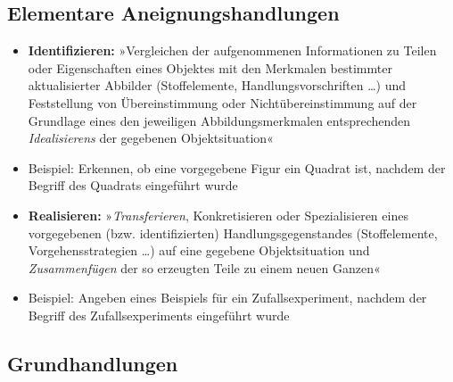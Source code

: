\documentclass[
]{scrbook}
\renewenvironment{quote}{
  \list{}{
	\leftmargin0.2cm   %
    \rightmargin\leftmargin
      	\def\FrameCommand
    {%
        {\color{quoteColor}\vrule width 2pt}%
        \hspace{0pt}%
    }%
    \MakeFramed{\advance \hsize -\width \FrameRestore}    \color{quoteColor}
    }
  \item\relax
}
{\endlist\color{black}\endMakeFramed}
\theoremstyle{definition}
\theoremstyle{definition}
\theoremstyle{definition}
\theoremstyle{definition}
\theoremstyle{remark}
\begin{document}
\subsection{Elementare Aneignungshandlungen}\label{elementare-aneignungshandlungen}

\begin{itemize}
\item
  \textbf{Identifizieren:} »Vergleichen der aufgenommenen Informationen zu Teilen oder Eigenschaften eines Objektes mit den Merkmalen bestimmter aktualisierter Abbilder (Stoffelemente, Handlungsvorschriften \ldots) und Feststellung von Übereinstimmung oder Nichtübereinstimmung auf der Grundlage eines den jeweiligen Abbildungsmerkmalen entsprechenden \emph{Idealisierens} der gegebenen Objektsituation«

  \begin{quote}
  Beispiel: Erkennen, ob eine vorgegebene Figur ein Quadrat ist, nachdem der Begriff des Quadrats eingeführt wurde
  \end{quote}
\item
  \textbf{Realisieren:} »\emph{Transferieren}, Konkretisieren oder Spezialisieren eines vorgegebenen (bzw. identifizierten) Handlungsgegenstandes (Stoffelemente, Vorgehensstrategien \ldots) auf eine gegebene Objektsituation und \emph{Zusammenfügen} der so erzeugten Teile zu einem neuen Ganzen«

  \begin{quote}
  Beispiel: Angeben eines Beispiels für ein Zufallsexperiment, nachdem der Begriff des Zufallsexperiments eingeführt wurde
  \end{quote}
\end{itemize}

\subsection{Grundhandlungen}\label{grundhandlungen}
\end{document}
